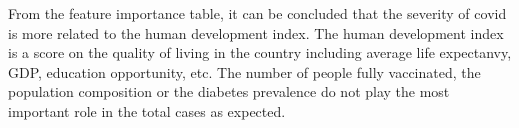 \documentclass[10pt, a4paper, twocolumn]{article} %
\begin{document}
From the feature importance table, it can be concluded that the severity of covid is more related 
to the human development index. The human development index is a score on the quality of living in the 
country including average life expectanvy, GDP, education opportunity, etc. The number of people fully 
vaccinated, the population composition or the diabetes prevalence do not play the most important role 
in the total cases as expected.   

\printbibliography[title={Bibliography}] %

\end{document}
